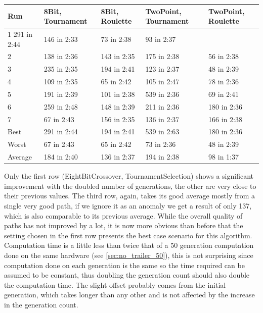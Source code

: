 \begin{center}
	\begin{tabular}{| l | l | l | p{3cm} | p{3cm}|}
		\hline
		Run 		& 8Bit, Tournament 	& 8Bit, Roulette 	& TwoPoint, Tournament 	& TwoPoint, Roulette	\\ \hline
		1				291 in 2:44					&	146 in 2:33			&	73 in 2:38						&	93 in 2:37					\\ \hline
		2				&	138 in 2:36				&	143 in 2:35			&	175 in 2:38						&	56 in 2:38					\\ \hline
		3				&	235 in 2:35				&	194 in 2:41			&	123 in 2:37						&	48 in 2:39					\\ \hline
		4				&	109 in 2:35				&	65 in 2:42			&	105 in 2:47						&	78 in 2:36					\\ \hline
		5				&	191 in 2:39				&	101 in 2:38			&	539 in 2:36						&	69 in 2:41					\\ \hline
		6				&	259 in 2:48				&	148 in 2:39			&	211 in 2:36						&	180 in 2:36					\\ \hline
		7				&	67 in 2:43				&	156 in 2:35			&	136 in 2:37						&	166 in 2:38					\\ \hline
		Best		&	291 in 2:44				&	194 in 2:41			&	539 in 2:63						&	180 in 2:36					\\ \hline
		Worst		&	67 in 2:43				&	65 in 2:42			&	73 in 2:36						& 48 in 2:39					\\ \hline
		Average	&	184 in 2:40				& 136 in 2:37			& 194 in 2:38						&	98 in 1:37					\\ \hline
		\hline
	\end{tabular}
\end{center}

Only the first row (EightBitCrossover, TournamentSelection) shows a significant improvement with the doubled number of generations, the other are very close to their previous values. The third row, again, takes its good average mostly from a single very good path, if we ignore it as an anomaly we get a result of only 137, which is also comparable to its previous average. While the overall quality of paths has not improved by a lot, it is now more obvious than before that the setting chosen in the first row presents the best case scenario for this algorithm. Computation time is a little less than twice that of a 50 generation computation done on the same hardware (see \ref{sec:no_trailer_50}), this is not surprising since computation done on each generation is the same so the time required can be assumed to be constant, thus doubling the generation count should also double the computation time. The slight offset probably comes from the initial generation, which takes longer than any other and is not affected by the increase in the generation count.

